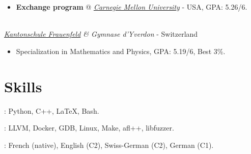 \documentclass[mm, 11pt]{simple_style}
\begin{document}
\begin{resume}
\begin{itemize}
  \item \textbf{Exchange program} @
\textit{\href{https://www.ece.cmu.edu/}{Carnegie Mellon University}} - USA, GPA: 5.26/6.
\end{itemize}
\\
\textsl{\href{https://www.kanti-frauenfeld.ch/}{Kantonschule Frauenfeld} \& Gymnase d'Yverdon} - Switzerland

\begin{itemize}
  \item Specialization in Mathematics and Physics, GPA: 5.19/6, Best 3\%.
\end{itemize}

\sectionline
\section{Skills}
: Python, C++, \LaTeX, Bash.

: LLVM, Docker, GDB, Linux, Make, afl++, libfuzzer.

: French (native), English (C2), Swiss-German (C2), German (C1).

\pagebreak
\sectionline

\end{resume}
\end{document}
